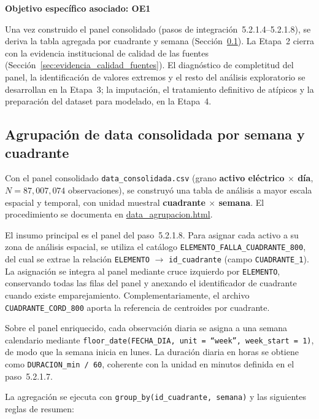 \textbf{Objetivo específico asociado: OE1}

Una vez construido el panel consolidado (pasos de integración~5.2.1.4--5.2.1.8), se deriva la tabla agregada por cuadrante y semana (Sección~\ref{sec:agrupacion_cuadrante_semana}). La Etapa~2 cierra con la evidencia institucional de calidad de las fuentes (Sección~\ref{sec:evidencia_calidad_fuentes}). El diagnóstico de completitud del panel, la identificación de valores extremos y el resto del análisis exploratorio se desarrollan en la Etapa~3; la imputación, el tratamiento definitivo de atípicos y la preparación del dataset para modelado, en la Etapa~4.

\subsection{Agrupación de data consolidada por semana y cuadrante}
\label{sec:agrupacion_cuadrante_semana}

Con el panel consolidado \texttt{data\_consolidada.csv} (grano \textbf{activo eléctrico $\times$ día}, $N = 87{,}007{,}074$ observaciones), se construyó una tabla de análisis a mayor escala espacial y temporal, con unidad muestral \textbf{cuadrante $\times$ semana}. El procedimiento se documenta en \href{\urlagrupacion}{data\_agrupacion.html}.

El insumo principal es el panel del paso~5.2.1.8. Para asignar cada activo a su zona de análisis espacial, se utiliza el catálogo \texttt{ELEMENTO\_FALLA\_CUADRANTE\_800}, del cual se extrae la relación \texttt{ELEMENTO} $\rightarrow$ \texttt{id\_cuadrante} (campo \texttt{CUADRANTE\_1}). La asignación se integra al panel mediante cruce izquierdo por \texttt{ELEMENTO}, conservando todas las filas del panel y anexando el identificador de cuadrante cuando existe emparejamiento. Complementariamente, el archivo \texttt{CUADRANTE\_CORD\_800} aporta la referencia de centroides por cuadrante.

Sobre el panel enriquecido, cada observación diaria se asigna a una semana calendario mediante \texttt{floor\_date(FECHA\_DIA, unit = ``week'', week\_start = 1)}, de modo que la semana inicia en lunes. La duración diaria en horas se obtiene como \texttt{DURACION\_min / 60}, coherente con la unidad en minutos definida en el paso~5.2.1.7.

La agregación se ejecuta con \texttt{group\_by(id\_cuadrante, semana)} y las siguientes reglas de resumen:

